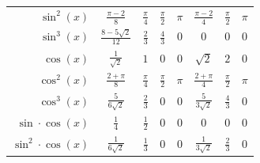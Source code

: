 \begin{multicols*}{2}
\begin{center}
\begin{tabular}{ r c c c c c c c }
            $\sin^2(x)$            & $\frac{\pi-2}{8}$                             & $\frac{\pi}{4}$                       & $\frac{\pi}{2}$             & $\pi$                        & $\frac{\pi-2}{4}$                                    & $\frac{\pi}{2}$                                      & $\pi$                            \\

            $\sin^3(x)$            & $\frac{8-5\sqrt{2}}{12}$                      & $\frac{2}{3}$                         & $\frac{4}{3}$               & $0$                          & $0$                                                  & $0$                                                  & $0$                              \\

            $\cos(x)$              & $\frac{1}{\sqrt{2}}$                          & $1$                                   & $0$                         & $0$                          & $\sqrt{2}$                                           & $2$                                                  & $0$                              \\

            $\cos^2(x)$            & $\frac{2+\pi}{8}$                             & $\frac{\pi}{4}$                       & $\frac{\pi}{2}$             & $\pi$                        & $\frac{2+\pi}{4}$                                    & $\frac{\pi}{2}$                                      & $\pi$                            \\

            $\cos^3(x)$            & $\frac{5}{6\sqrt{2}}$                         & $\frac{2}{3}$                         & $0$                         & $0$                          & $\frac{5}{3\sqrt{2}}$                                & $\frac{4}{3}$                                        & $0$                              \\

            $\sin \cdot \cos(x)$   & $\frac{1}{4}$                                 & $\frac{1}{2}$                         & $0$                         & $0$                          & $0$                                                  & $0$                                                  & $0$                              \\

            $\sin^2 \cdot \cos(x)$ & $\frac{1}{6\sqrt{2}}$                         & $\frac{1}{3}$                         & $0$                         & $0$                          & $\frac{1}{3\sqrt{2}}$                                & $\frac{2}{3}$                                        & $0$                              \\


\end{tabular}
\end{center}
\end{multicols*}
